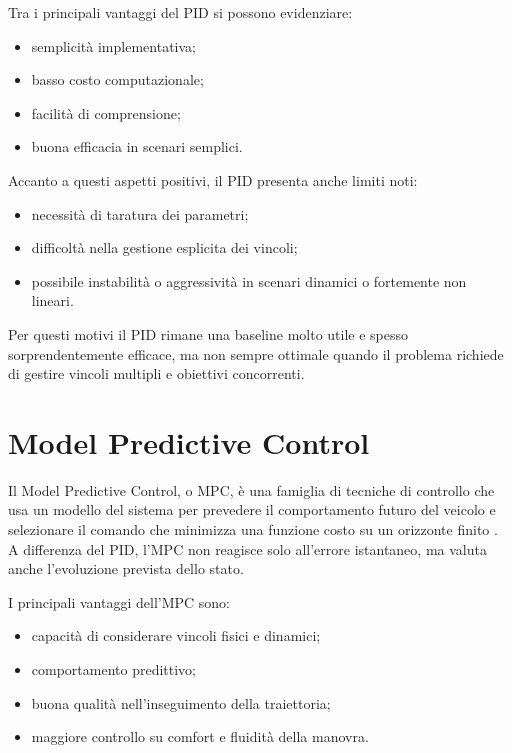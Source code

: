 Tra i principali vantaggi del PID si possono evidenziare:

\begin{itemize}
    \item semplicità implementativa;
    \item basso costo computazionale;
    \item facilità di comprensione;
    \item buona efficacia in scenari semplici.
\end{itemize}

Accanto a questi aspetti positivi, il PID presenta anche limiti noti:

\begin{itemize}
    \item necessità di taratura dei parametri;
    \item difficoltà nella gestione esplicita dei vincoli;
    \item possibile instabilità o aggressività in scenari dinamici o fortemente non lineari.
\end{itemize}

Per questi motivi il PID rimane una baseline molto utile e spesso sorprendentemente efficace, ma non sempre ottimale quando il problema richiede di gestire vincoli multipli e obiettivi concorrenti.

\section{Model Predictive Control}

Il Model Predictive Control, o MPC, è una famiglia di tecniche di controllo che usa un modello del sistema per prevedere il comportamento futuro del veicolo e selezionare il comando che minimizza una funzione costo su un orizzonte finito \cite{camacho2007mpc}. A differenza del PID, l'MPC non reagisce solo all'errore istantaneo, ma valuta anche l'evoluzione prevista dello stato.

I principali vantaggi dell'MPC sono:

\begin{itemize}
    \item capacità di considerare vincoli fisici e dinamici;
    \item comportamento predittivo;
    \item buona qualità nell'inseguimento della traiettoria;
    \item maggiore controllo su comfort e fluidità della manovra.
\end{itemize}


